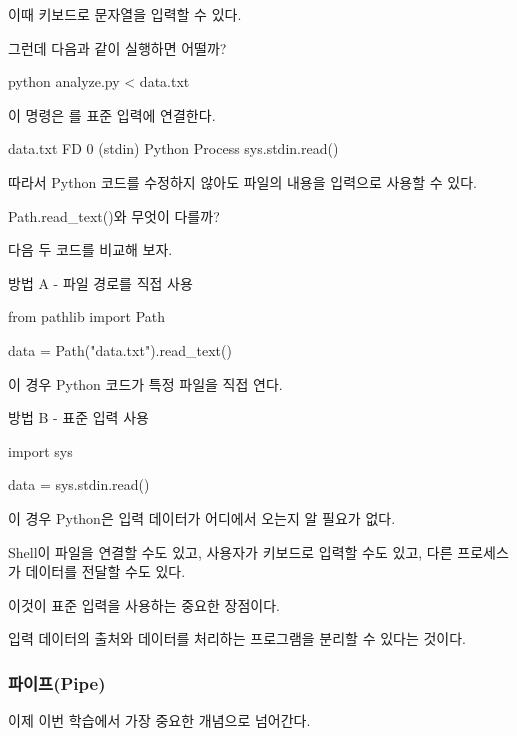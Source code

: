 이때 키보드로 문자열을 입력할 수 있다.

그런데 다음과 같이 실행하면 어떨까?

\begin{dhkzsh}
python analyze.py < data.txt
\end{dhkzsh}

이 명령은 를 표준 입력에 연결한다.

\begin{dhksmry}[centered]
data.txt
\da
FD 0 (stdin)
\da
Python Process
\da
sys.stdin.read()
\end{dhksmry}

따라서 Python 코드를 수정하지 않아도 파일의 내용을 입력으로 사용할 수 있다.

\begin{dhknote}
\begin{dhksmry}[centered]
Path.read_text()와 무엇이 다를까?
\end{dhksmry}
\end{dhknote}

다음 두 코드를 비교해 보자.

방법 A - 파일 경로를 직접 사용

\begin{dhkcode}
from pathlib import Path

data = Path("data.txt").read_text()
\end{dhkcode}

이 경우 Python 코드가 특정 파일을 직접 연다.

방법 B - 표준 입력 사용

\begin{dhkcode}
import sys

data = sys.stdin.read()
\end{dhkcode}

이 경우 Python은 입력 데이터가 어디에서 오는지 알 필요가 없다.

Shell이 파일을 연결할 수도 있고, 사용자가 키보드로 입력할 수도 있고, 다른 프로세스가 데이터를 전달할 수도 있다.

이것이 표준 입력을 사용하는 중요한 장점이다.

입력 데이터의 출처와 데이터를 처리하는 프로그램을 분리할 수 있다는 것이다.

\subsubsection{파이프(Pipe) \zsh{|}}

이제 이번 학습에서 가장 중요한 개념으로 넘어간다.

